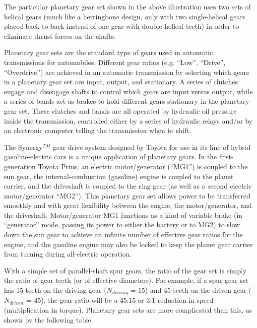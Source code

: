 The particular planetary gear set shown in the above illustration uses two sets of helical gears (much like a herringbone design, only with two single-helical gears placed back-to-back instead of one gear with double-helical teeth) in order to eliminate thrust forces on the shafts.

Planetary gear sets are the standard type of gears used in automatic transmissions for automobiles.  Different gear ratios (e.g. ``Low'', ``Drive'', ``Overdrive'') are achieved in an automatic transmission by selecting which gears in a planetary gear set are input, output, and stationary.  A series of clutches engage and disengage shafts to control which gears are input versus output, while a series of bands act as brakes to hold different gears stationary in the planetary gear set.  These clutches and bands are all operated by hydraulic oil pressure inside the transmission, controlled either by a series of hydraulic relays and/or by an electronic computer telling the transmission when to shift.

\vskip 10pt

The Synergy$^{TM}$ gear drive system designed by Toyota for use in its line of hybrid gasoline-electric cars is a unique application of planetary gears.  In the first-generation Toyota Prius, an electric motor/generator (``MG1'') is coupled to the sun gear, the internal-combustion (gasoline) engine is coupled to the planet carrier, and the driveshaft is coupled to the ring gear (as well as a second electric motor/generator ``MG2'').  This planetary gear set allows power to be transferred smoothly and with great flexibility between the engine, the motor/generator, and the driveshaft.  Motor/generator MG1 functions as a kind of variable brake (in ``generator'' mode, passing its power to either the battery or to MG2) to slow down the sun gear to achieve an infinite number of effective gear ratios for the engine, and the gasoline engine may also be locked to keep the planet gear carrier from turning during all-electric operation.    

With a simple set of parallel-shaft spur gears, the ratio of the gear set is simply the ratio of gear teeth (or of effective diameters).  For example, if a spur gear set has 15 teeth on the driving gear ($N_{driving}$ = 15) and 45 teeth on the driven gear ($N_{driven}$ = 45), the gear ratio will be a 45:15 or 3:1 reduction in speed (multiplication in torque).  Planetary gear sets are more complicated than this, as shown by the following table:

